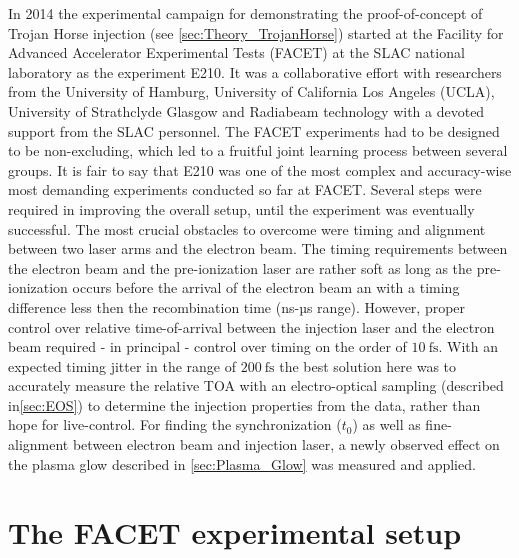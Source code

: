 













In 2014 the experimental campaign  for demonstrating the proof-of-concept of Trojan Horse injection (see \ref{sec:Theory_TrojanHorse}) started at the Facility for Advanced Accelerator Experimental Tests (FACET) at the SLAC national laboratory as the experiment E210. It was a collaborative effort with researchers from the University of Hamburg, University of California Los Angeles (UCLA), University of Strathclyde Glasgow and Radiabeam technology with a devoted support from the SLAC personnel. The FACET experiments had to be designed to be non-excluding, which led to a fruitful joint learning process between several groups.
It is fair to say that E210 was one of the most complex and accuracy-wise most demanding experiments conducted so far at FACET. 
Several steps were required in improving the overall setup, until the experiment was eventually successful.
The most crucial obstacles to overcome were timing and alignment between two laser arms and the electron beam.
The timing requirements between the electron beam and the pre-ionization laser are rather soft as long as the pre-ionization occurs before the arrival of the electron beam an with a timing difference less then the recombination time (ns-µs range). However, proper control over relative time-of-arrival between the injection laser and the electron beam required - in principal - control over timing on the order of $10\ \mathrm{fs}$. With an expected timing jitter in the range of $200\ \mathrm{fs}$ the best solution here was to accurately measure the relative TOA with an electro-optical sampling (described in\ref{sec:EOS}) to determine the injection properties from the data, rather than hope for live-control. 
For finding the synchronization ($t_0$) as well as fine-alignment between electron beam and injection laser, a newly observed effect on the plasma glow described in \ref{sec:Plasma_Glow} was measured and applied.

\section{The FACET experimental setup}
